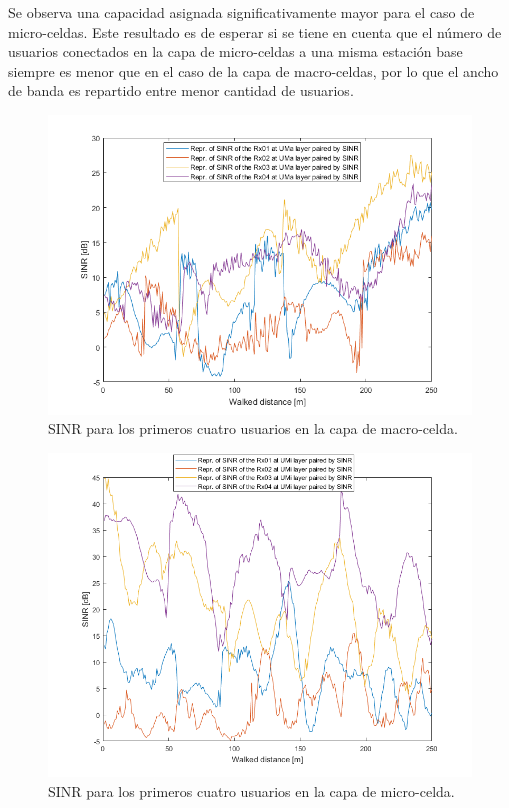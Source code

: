 Se observa una capacidad asignada significativamente mayor para el caso de micro-celdas. Este resultado es de esperar si se tiene en cuenta que el número de usuarios conectados en la capa de micro-celdas a una misma estación base siempre es menor que en el caso de la capa de macro-celdas, por lo que el ancho de banda es repartido entre menor cantidad de usuarios.

\begin{figure}[h!]
	\centering
    \includegraphics[width=0.8\linewidth]{imagenes/6_2_sinr_uma.png}
	\caption{SINR para los primeros cuatro usuarios en la capa de macro-celda.}
	\label{fig:simulacion_completa_sinr_uma}
\end{figure}

\begin{figure}[h!]
	\centering
    \includegraphics[width=0.8\linewidth]{imagenes/6_2_sinr_umi.png}
	\caption{SINR para los primeros cuatro usuarios en la capa de micro-celda.}
	\label{fig:simulacion_completa_sinr_umi}
\end{figure}

